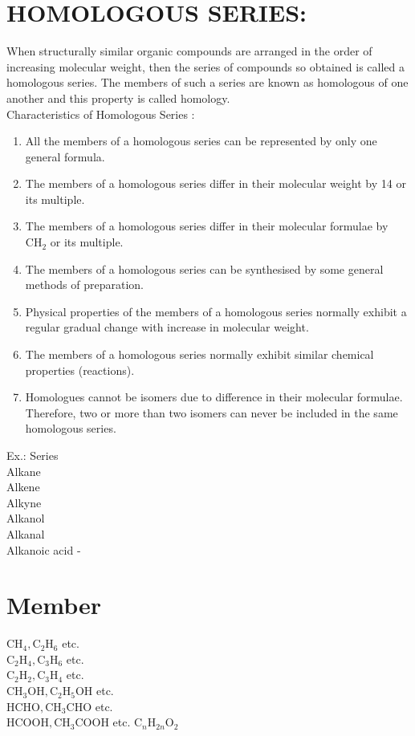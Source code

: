 \documentclass[10pt]{article}
\begin{document}
\section*{HOMOLOGOUS SERIES:}
When structurally similar organic compounds are arranged in the order of increasing molecular weight, then the series of compounds so obtained is called a homologous series. The members of such a series are known as homologous of one another and this property is called homology.\\
Characteristics of Homologous Series :

\begin{enumerate}
  \item All the members of a homologous series can be represented by only one general formula.
  \item The members of a homologous series differ in their molecular weight by 14 or its multiple.
  \item The members of a homologous series differ in their molecular formulae by $\mathrm{CH}_{2}$ or its multiple.
  \item The members of a homologous series can be synthesised by some general methods of preparation.
  \item Physical properties of the members of a homologous series normally exhibit a regular gradual change with increase in molecular weight.
  \item The members of a homologous series normally exhibit similar chemical properties (reactions).
  \item Homologues cannot be isomers due to difference in their molecular formulae. Therefore, two or more than two isomers can never be included in the same homologous series.
\end{enumerate}

Ex.: Series\\
Alkane\\
Alkene\\
Alkyne\\
Alkanol\\
Alkanal\\
Alkanoic acid -

\section*{Member}
$\mathrm{CH}_{4}, \mathrm{C}_{2} \mathrm{H}_{6}$ etc.\\
$\mathrm{C}_{2} \mathrm{H}_{4}, \mathrm{C}_{3} \mathrm{H}_{6}$ etc.\\
$\mathrm{C}_{2} \mathrm{H}_{2}, \mathrm{C}_{3} \mathrm{H}_{4}$ etc.\\
$\mathrm{CH}_{3} \mathrm{OH}, \mathrm{C}_{2} \mathrm{H}_{5} \mathrm{OH}$ etc.\\
$\mathrm{HCHO}, \mathrm{CH}_{3} \mathrm{CHO}$ etc.\\
$\mathrm{HCOOH}, \mathrm{CH}_{3} \mathrm{COOH}$ etc. $\mathrm{C}_{n} \mathrm{H}_{2 n} \mathrm{O}_{2}$
\end{document}
